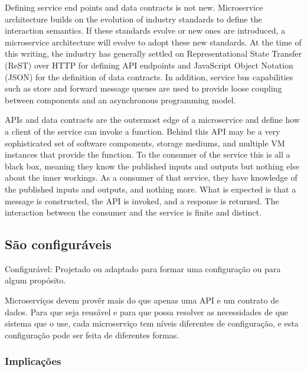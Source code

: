 Defining service end points and data contracts is not new. Microservice architecture builds on the evolution of industry standards to define the interaction semantics. If these standards evolve or new ones are introduced, a microservice architecture will evolve to adopt these new standards. 
At the time of this writing, the industry has generally settled on Representational State Transfer (ReST) over HTTP for defining API endpoints and JavaScript Object Notation (JSON) for the definition of data contracts. In addition, service bus capabilities such as store and forward message queues are used to provide loose coupling between components and an asynchronous programming model.

APIs and data contracts are the outermost edge of a microservice and define how a client of the service can invoke a function. Behind this API may be a very sophisticated set of software components, storage mediums, and multiple VM instances that provide the function. To the consumer of the service this is all a black box, meaning they know the published inputs and outputs but nothing else about the inner workings. As a consumer of that service, they have knowledge of the published inputs and outputs, and nothing more. What is expected is that a message is constructed, the API is invoked, and a response is returned. The interaction between the consumer and the service is finite and distinct.

\subsection{São configuráveis}

Configurável: Projetado ou adaptado para formar uma configuração ou para algum propósito.

Microserviços devem provêr mais do que apenas uma API e um contrato de dados. Para que seja reusável e para que possa resolver as necessidades de que sistema que o use, cada microserviço tem níveis diferentes de configuração, e esta configuração pode ser feita de diferentes formas.

\subsubsection*{Implicações}

